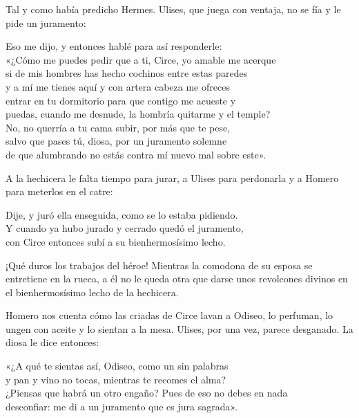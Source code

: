 Tal y como había predicho Hermes. Ulises, que juega con ventaja, no se fía y le pide un juramento:

\begin{versocita}
Eso me dijo, y entonces hablé para así responderle:\\
«¿Cómo me puedes pedir que a ti, Circe, yo amable me acerque\\
si de mis hombres has hecho cochinos entre estas paredes\\
y a mí me tienes aquí y con artera cabeza me ofreces\\
entrar en tu dormitorio para que contigo me acueste y\\
puedas, cuando me desnude, la hombría quitarme y el temple?\\
No, no querría a tu cama subir, por más que te pese,\\
salvo que pases tú, diosa, por un juramento solemne\\
de que alumbrando no estás contra mí nuevo mal sobre este».
\end{versocita}

A la hechicera le falta tiempo para jurar, a Ulises para perdonarla y a Homero para meterlos en el catre:

\begin{versocita}
Dije, y juró ella enseguida, como se lo estaba pidiendo.\\
Y cuando ya hubo jurado y cerrado quedó el juramento,\\
con Circe entonces subí a su bienhermosísimo lecho.
\end{versocita}

¡Qué duros los trabajos del héroe! Mientras la comodona de su esposa se entretiene en la rueca, a él no le queda otra que darse unos revolcones divinos en el bienhermosísimo lecho de la hechicera.

Homero nos cuenta cómo las criadas de Circe lavan a Odiseo, lo perfuman, lo ungen con aceite y lo sientan a la mesa. Ulises, por una vez, parece desganado. La diosa le dice entonces:

\begin{versocita}
«¿A qué te sientas así, Odiseo, como un sin palabras\\
y pan y vino no tocas, mientras te recomes el alma?\\
¿Piensas que habrá un otro engaño? Pues de eso no debes en nada\\
desconfiar: me di a un juramento que es jura sagrada».
\end{versocita}

